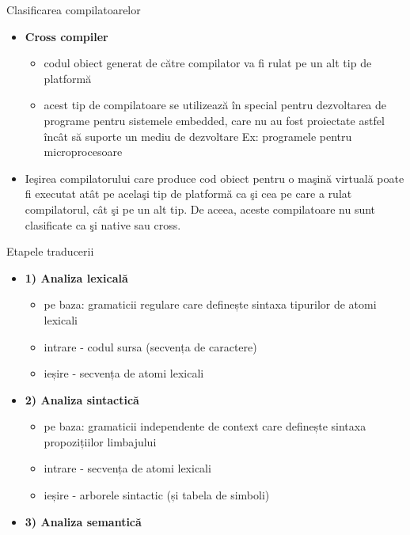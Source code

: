 \documentclass[pdf]{beamer}
\begin{document}
\begin{frame}{Clasificarea compilatoarelor}
\begin{itemize}
\item
\textbf{Cross compiler}

\begin{itemize}
\item
codul obiect generat de către compilator va fi rulat pe un alt tip de platformă

\item
acest tip de compilatoare se utilizează în special pentru dezvoltarea de programe pentru sistemele embedded, care nu au fost proiectate astfel încât să suporte un mediu de dezvoltare
\newline
Ex: programele pentru microprocesoare\newline
\end{itemize}

\item
Ieşirea compilatorului care produce cod obiect pentru o maşină virtuală poate fi executat atât pe acelaşi tip de platformă ca şi cea pe care a rulat compilatorul, cât şi pe un alt tip. De aceea, aceste compilatoare nu sunt clasificate ca şi native sau cross.
\end{itemize}
\end{frame}



\begin{frame}{Etapele traducerii}
\begin{itemize}
\item
\textbf{1) Analiza lexicală}
\begin{itemize}
\item
pe baza: gramaticii regulare care definește sintaxa tipurilor de atomi lexicali

\item
intrare - codul sursa (secvența de caractere)

\item
ieșire - secvența de atomi lexicali 
\end{itemize}

\item
\textbf{2) Analiza sintactică}
\begin{itemize}
\item
pe baza: gramaticii independente de context care definește sintaxa propozițiilor limbajului

\item
intrare - secvența de atomi lexicali

\item
ieșire - arborele sintactic (și tabela de simboli)
\end{itemize}

\item
\textbf{3) Analiza semantică}
\end{itemize}
\end{frame}
\end{document}
